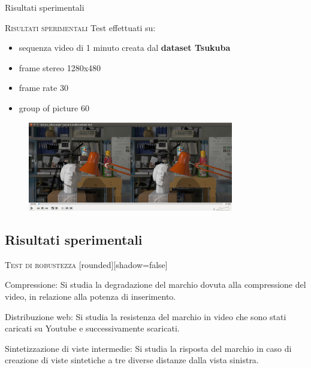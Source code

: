\documentclass{beamer}
\begin{document}
\begin{section}{Risultati sperimentali}

\begin{frame}[t]{\textsc{Risultati sperimentali}}
Test effettuati su:
\begin{itemize}
\item sequenza video di 1 minuto creata dal \textbf{dataset Tsukuba}
\item frame stereo 1280x480
\item frame rate 30
\item group of picture 60
\end{itemize}

\vspace{2mm}
\begin{figure}
  \includegraphics[width=0.8\textwidth]{./img_wat/video_stereo.png}  
  \label{fig:video}
\end{figure}
\end{frame}

\subsection{Risultati sperimentali}

\begin{frame}[t]{\textsc{Test di robustezza}}
[rounded][shadow=false]
\begin{block}{Compressione:}
Si studia la degradazione del marchio dovuta alla compressione del video, in relazione alla potenza di inserimento.
\end{block}
\begin{block}{Distribuzione web:}
Si studia la resistenza del marchio in video che sono stati caricati su Youtube e successivamente scaricati.
\end{block}
\begin{block}{Sintetizzazione di viste intermedie:}
Si studia la risposta del marchio in caso di creazione di viste sintetiche a tre diverse distanze dalla vista sinistra.
\end{block}


\end{frame}
\end{section}
\end{document}
